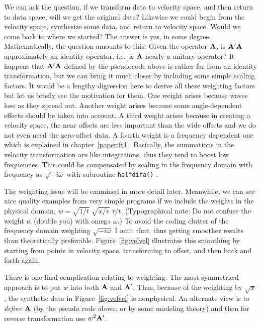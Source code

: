 \par
We can ask the question, if we transform data to velocity space,
and then return to data space,
will we get the original data?
Likewise we could begin from the velocity space,
synthesize some data, and return to velocity space.
Would we come back to where we started?
The answer is yes, in some degree.
Mathematically, the question amounts to this:
Given the operator $\bold A$, is $\bold A'\bold A$ approximately
an identity operator, i.e.~is $\bold A$ nearly a unitary operator?
It happens that $\bold A'\bold A$ defined by the pseudocode above
is rather far from an identity transformation,
but we can bring it much closer
by including some simple scaling factors.
It would be a lengthy digression here to derive all these weighting factors
but let us briefly see the motivation for them.
One weight arises because waves lose  as they spread out.
Another weight arises because some angle-dependent effects should be taken
into account.  A third weight arises because in creating a velocity space,
the near offsets are less important than the wide offsets
and we do not even need the zero-offset data.
A fourth weight is a frequency dependent one
which is explained in chapter~\ref{paper:ft1}.
Basically, the summations in the velocity transformation are like integrations,
thus they tend to boost low frequencies.
This could be compensated by scaling
in the frequency domain
with frequency as $\sqrt{-i\omega}$
with subroutine \texttt{halfdifa()} .

\par
The weighting issue will be examined in more detail later.
Meanwhile, we can see nice quality examples
from very simple programs
if we include the weights
in the physical domain, $w= \sqrt{1/t}\; \sqrt{x/v}\; \tau /t $.
(Typographical note:  Do not confuse
the weight $w$ (double you) with omega $\omega$.)
To avoid the coding clutter of the frequency domain weighting
$\sqrt{-i\omega}$ I omit that,
thus getting smoother results than theoretically preferable.
Figure~\ref{fig:velvel} illustrates this smoothing by starting
from points in velocity space, transforming to offset,
and then back and forth again.


\par
There is one final complication relating to weighting.
The most symmetrical approach is to put
$w$ into both $\bold A$ and $\bold A'$.
Thus, because of the weighting by $\sqrt{x}$,
the synthetic data in Figure~\ref{fig:velvel} is
nonphysical.
An alternate view is to {\em  define} $\bold A$
(by the pseudo code above, or by some modeling theory)
and then for reverse transformation
use $w^2\bold A'$.

